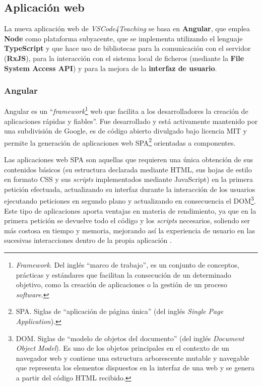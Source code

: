 \subsection{Aplicación web}
\label{subsec:tecAppWeb}

La nueva aplicación web de \textit{VSCode4Teaching} se basa en \textbf{Angular}, que emplea \textbf{Node} como plataforma subyacente, que se implementa utilizando el lenguaje \textbf{TypeScript} y que hace uso de bibliotecas para la comunicación con el servidor (\textbf{RxJS}), para la interacción con el sistema local de ficheros (mediante la \textbf{File System Access API}) y para la mejora de la \textbf{interfaz de usuario}.

\subsubsection{Angular}
\label{subsec:tecAngular}
Angular es un ``\textit{framework}\footnote{\textit{Framework}. Del inglés ``marco de trabajo'', es un conjunto de conceptos, prácticas y estándares que facilitan la consecución de un determinado objetivo, como la creación de aplicaciones o la gestión de un proceso \textit{software}.} web que facilita a los desarrolladores la creación de aplicaciones rápidas y fiables''\cite{Tec_Angular}. Fue desarrollado y está activamente mantenido por una subdivisión de Google, es de código abierto divulgado bajo licencia MIT y permite la generación de aplicaciones web SPA\footnote{SPA. Siglas de ``aplicación de página única'' (del inglés \textit{Single Page Application}).} orientadas a componentes.

Las aplicaciones web SPA son aquellas que requieren una única obtención de sus contenidos básicos (su estructura declarada mediante HTML, sus hojas de estilo en formato CSS y sus \textit{scripts} implementados mediante JavaScript) en la primera petición efectuada, actualizando su interfaz durante la interacción de los usuarios ejecutando peticiones en segundo plano y actualizando en consecuencia el DOM\footnote{DOM. Siglas de ``modelo de objetos del documento'' (del inglés \textit{Document Object Model}). Es uno de los objetos principales en el contexto de un navegador web y contiene una estructura arborescente mutable y navegable que representa los elementos dispuestos en la interfaz de una web y se genera a partir del código HTML recibido.}. Este tipo de aplicaciones aporta ventajas en materia de rendimiento, ya que en la primera petición se devuelve todo el código y los \textit{scripts} necesarios, soliendo ser más costosa en tiempo y memoria, mejorando así la experiencia de usuario en las sucesivas interacciones dentro de la propia aplicación \cite{SPA_Ventajas}.

